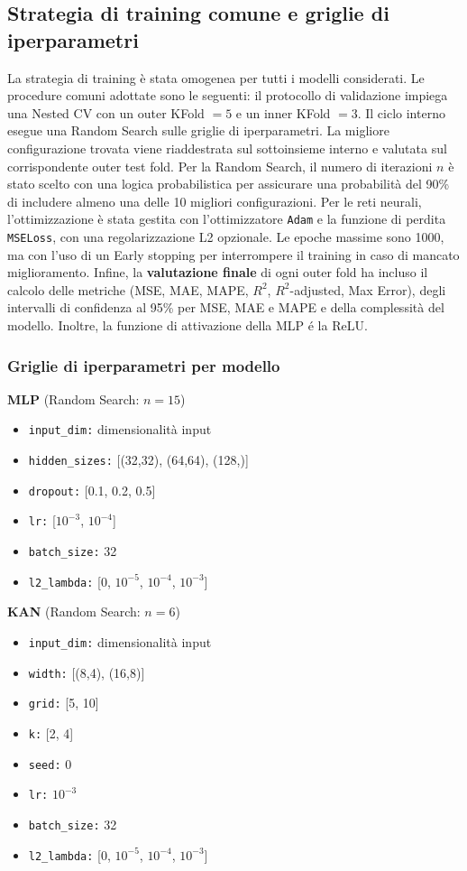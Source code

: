 \documentclass[a4paper,12pt]{report}
\begin{document}
	\subsection{Strategia di training comune e griglie di iperparametri}
	La strategia di training è stata omogenea per tutti i modelli considerati. Le procedure comuni adottate sono le seguenti: il protocollo di validazione impiega una Nested CV con un outer KFold $= 5$ e un inner KFold $= 3$. Il ciclo interno esegue una Random Search sulle griglie di iperparametri. La migliore configurazione trovata viene riaddestrata sul sottoinsieme interno e valutata sul corrispondente outer test fold. Per la Random Search, il numero di iterazioni $n$ è stato scelto con una logica probabilistica per assicurare una probabilità del 90\% di includere almeno una delle 10 migliori configurazioni. Per le reti neurali, l'ottimizzazione è stata gestita con l'ottimizzatore \texttt{Adam} e la funzione di perdita \texttt{MSELoss}, con una regolarizzazione L2 opzionale. Le epoche massime sono 1000, ma con l'uso di un Early stopping per interrompere il training in caso di mancato miglioramento. Infine, la \textbf{valutazione finale} di ogni outer fold ha incluso il calcolo delle metriche (MSE, MAE, MAPE, $R^2$, $R^2$-adjusted, Max Error), degli intervalli di confidenza al 95\% per MSE, MAE e MAPE e della complessità del modello. Inoltre, la funzione di attivazione della MLP é la ReLU.
	
	\subsubsection{Griglie di iperparametri per modello}
	\smallskip
	\noindent\textbf{MLP} \quad (Random Search: $n=15$)
	\begin{itemize}
		\item \texttt{input\_dim:} dimensionalità input
		\item \texttt{hidden\_sizes:} [(32,32), (64,64), (128,)]
		\item \texttt{dropout:} [0.1, 0.2, 0.5]
		\item \texttt{lr:} [$10^{-3}$, $10^{-4}$]
		\item \texttt{batch\_size:} 32
		\item \texttt{l2\_lambda:} [0, $10^{-5}$, $10^{-4}$, $10^{-3}$]
	\end{itemize}
	
	\smallskip
	\noindent\textbf{KAN} \quad (Random Search: $n=6$)
	\begin{itemize}
		\item \texttt{input\_dim:} dimensionalità input
		\item \texttt{width:} [(8,4), (16,8)]
		\item \texttt{grid:} [5, 10]
		\item \texttt{k:} [2, 4]
		\item \texttt{seed:} 0
		\item \texttt{lr:} $10^{-3}$
		\item \texttt{batch\_size:} 32
		\item \texttt{l2\_lambda:} [0, $10^{-5}$, $10^{-4}$, $10^{-3}$]
	\end{itemize}
	
\end{document}
